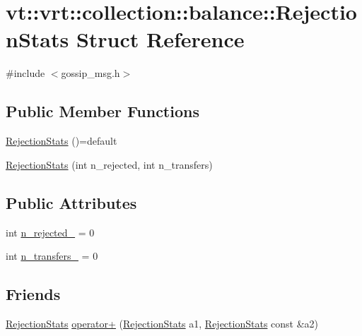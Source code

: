 \hypertarget{structvt_1_1vrt_1_1collection_1_1balance_1_1_rejection_stats}{}\section{vt\+:\+:vrt\+:\+:collection\+:\+:balance\+:\+:Rejection\+Stats Struct Reference}
\label{structvt_1_1vrt_1_1collection_1_1balance_1_1_rejection_stats}


{\ttfamily \#include $<$gossip\+\_\+msg.\+h$>$}

\subsection*{Public Member Functions}
\begin{DoxyCompactItemize}
\item 
\hyperlink{structvt_1_1vrt_1_1collection_1_1balance_1_1_rejection_stats_a8cb571e840ac99b47d6dfce54b8569fa}{Rejection\+Stats} ()=default
\item 
\hyperlink{structvt_1_1vrt_1_1collection_1_1balance_1_1_rejection_stats_a3a79871f2f2efe909b375a87d50281e3}{Rejection\+Stats} (int n\+\_\+rejected, int n\+\_\+transfers)
\end{DoxyCompactItemize}
\subsection*{Public Attributes}
\begin{DoxyCompactItemize}
\item 
int \hyperlink{structvt_1_1vrt_1_1collection_1_1balance_1_1_rejection_stats_a1925785748fd405e5f9062a2c38b36f6}{n\+\_\+rejected\+\_\+} = 0
\item 
int \hyperlink{structvt_1_1vrt_1_1collection_1_1balance_1_1_rejection_stats_a5cf0b43c9b564e132da0a7045ab9c865}{n\+\_\+transfers\+\_\+} = 0
\end{DoxyCompactItemize}
\subsection*{Friends}
\begin{DoxyCompactItemize}
\item 
\hyperlink{structvt_1_1vrt_1_1collection_1_1balance_1_1_rejection_stats}{Rejection\+Stats} \hyperlink{structvt_1_1vrt_1_1collection_1_1balance_1_1_rejection_stats_a363bf613ec409e35e5dd3192a9c552a3}{operator+} (\hyperlink{structvt_1_1vrt_1_1collection_1_1balance_1_1_rejection_stats}{Rejection\+Stats} a1, \hyperlink{structvt_1_1vrt_1_1collection_1_1balance_1_1_rejection_stats}{Rejection\+Stats} const \&a2)
\end{DoxyCompactItemize}


